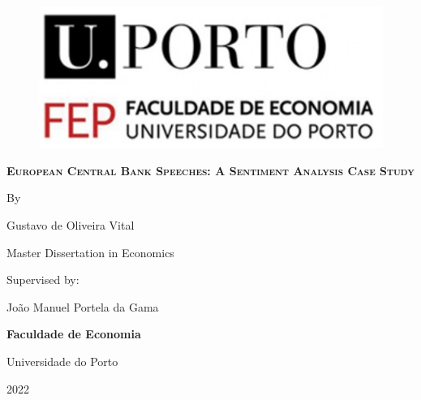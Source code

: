 \date{}
\begin{titlepage}
\begin{center}

\begin{figure}[ht!]
    \centering
    \includegraphics[scale=0.5]{images/FEP.PNG}
\end{figure}

\vspace*{0.7in}
{\LARGE \textbf{ {\scshape European Central Bank Speeches: A Sentiment Analysis Case Study}}}
\par
\vspace{0.4in}
{\large By}
\par
\vspace{0.4in}
{\large Gustavo de Oliveira Vital}
\par
\vspace{1in}
{\large Master Dissertation in Economics}
\par
\vspace{0.8in}
\end{center}
{\large Supervised by:} \\ 
\par
{\large João Manuel Portela da Gama}
\par
\vspace{0.10in}
\vspace{1in}
\begin{center}
{\large \textbf{Faculdade de Economia}}
\par
\vspace{0.10in}
{\large Universidade do Porto}
\par
\vspace{0.2in}
{\large 2022}
\end{center}
\end{titlepage}

